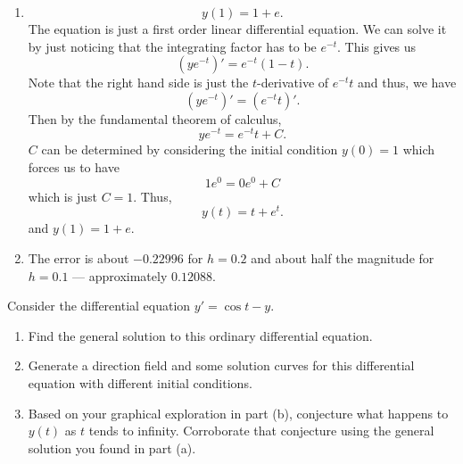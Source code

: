 \documentclass[12 pt, letterpaper]{hmcpset}
\begin{document}
\begin{solution}
\begin{enumerate}
			Using the Python code --- executing \texttt{EulersMethod(1, 0, 1, 0.2, ydot)} --- we get the following lists for $h = 0.2$.
			\begin{align*}
				y_{0} & = 1 & y_{0}' & = 2 \\
				y_{1} & = 1.4 & y_{1}' & = 2.2 \\
				y_{2} & = 1.84 & y_{2}' & = 2.44 \\
				y_{3} & = 2.328 & y_{3}' & = 2.728 \\
				y_{4} & = 2.8736 & y_{4} & = 3.0736 \\
				y_{5} & = 3.48832
			\end{align*}
			Similarly, for $h = 0.1$ we execute \texttt{EulersMethod(1, 0, 1, 0,1, ydot)} and get $y_{10} \approx 3.59374$ (rounded to five decimal places).
		\item
			\[
				\boxed{
					y(1) = 1 + e.
				}
			\]
			The equation is just a first order linear differential equation. We can solve it by just noticing that the integrating factor has to be $e^{-t}$. This gives us
			\[
				(y e^{-t})' = e^{-t} (1 - t).
			\]
			Note that the right hand side is just the $t$-derivative of $e^{-t} t$ and thus, we have
			 \[
				 (y e^{-t})' = (e^{-t} t)'.
			\]
			Then by the fundamental theorem of calculus,
			\[
				y e^{-t} = e^{-t} t + C.
			\]
			$C$ can be determined by considering the initial condition $y(0) = 1$ which forces us to have
			\[
				1 e^{0} = 0 e^{0} + C
			\]
			which is just $C = 1$. Thus,
			\[
				y(t) = t + e^{t}.
			\]
			and $y(1) = 1 + e$.
		\item
			The error is about $-0.22996$ for $h = 0.2$ and about half the magnitude for $h = 0.1$ --- approximately $0.12088$.
	\end{enumerate}
\end{solution}

\pagebreak

\begin{problem}[2:]
	Consider the differential equation $y' = \cos{t} - y$.
	\begin{enumerate}
		\item Find the general solution to this ordinary differential equation.
		\item Generate a direction field and some solution curves for this differential equation with different initial conditions.
		\item Based on your graphical exploration in part (b), conjecture what happens to $y(t)$ as $t$ tends to infinity. Corroborate that conjecture using the general solution you found in part (a).
	\end{enumerate}
\end{problem}
\end{document}
